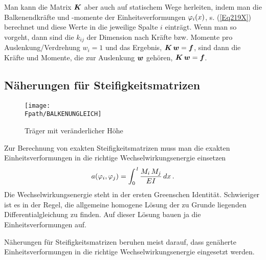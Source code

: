 Man kann die Matrix $\mbox{\boldmath $K$}$ aber auch auf statischem Wege herleiten, indem man die  Balkenendkr\"{a}fte und -momente der Einheitsverformungen $\varphi_i(x)$, s. (\ref{Eq219X}) berechnet und diese Werte in die jeweilige Spalte $i$ eintr\"{a}gt. Wenn man so vorgeht, dann sind die $k_{ij}$ der Dimension nach Kr\"{a}fte  bzw. Momente pro Auslenkung/Verdrehung $w_i = 1$ und das Ergebnis, $\mbox{\boldmath $K$}\,\mbox{\boldmath $w$} = \mbox{\boldmath $f$}$, sind dann die Kr\"{a}fte und Momente, die zur Auslenkung $\mbox{\boldmath $w$}$ geh\"{o}ren, $\mbox{\boldmath $K$}\,\mbox{\boldmath $w$} = \mbox{\boldmath $f$}$.

{\textcolor{sectionTitleBlue}{\section{N\"{a}herungen f\"{u}r Steifigkeitsmatrizen}}}
\begin{figure}[tbp] \centering
\if {} \sidecaption \fi
\texttt{[image: \\Fpath/BALKENUNGLEICH]}
\caption{Tr\"{a}ger mit ver\"{a}nderlicher H\"{o}he}
\label{BalkenUngleich}%
\end{figure}%
Zur Berechnung von exakten Steifigkeitsmatrizen muss man  die exakten Einheitsverformungen in die richtige Wechselwirkungsenergie einsetzen
\begin{align}
a(\varphi_i,\varphi_j) = \int_0^{\,l} \frac{M_i\,M_j}{EI}\,dx\,.
\end{align}
Die Wechselwirkungsenergie steht in der ersten Greenschen Identit\"{a}t. Schwieriger ist es in der Regel, die allgemeine homogene L\"{o}sung der zu Grunde liegenden Differentialgleichung zu finden. Auf dieser L\"{o}sung bauen ja die Einheitsverformungen auf.

N\"{a}herungen f\"{u}r Steifigkeitsmatrizen beruhen meist darauf, dass gen\"{a}herte Einheitsverformungen in die richtige Wechselwirkungsenergie
eingesetzt werden.

